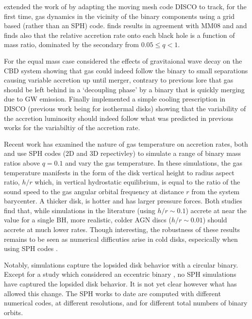 \citep{Farris:2014} extended the work of \citep{DHM:2013:MNRAS} by adapting the
moving mesh code DISCO \citep{Duffell:2011:TESS,
DuffellMHDDISCO:2016} to track, for the first time, gas dynamics in the
vicinity of the binary components using a grid based (rather than an SPH)
code. \citep{Farris:2014} finds results in agreement with MM08 and
\citep{DHM:2013:MNRAS} and finds also that the relative accretion rate onto
each black hole is a function of mass ratio, dominated by the secondary from
$0.05 \leq q < 1$. 


For the equal mass case \citep{Farris:2015:GW} considered
the effects of gravitaional wave decay on the CBD system showing that gas
could indeed follow the binary to small separations causing variable accretion
up until merger, contrary to previous lore that gas should be left behind in a
`decoupling phase' by a binary that is quickly merging due to GW emission.
Finally \citep{Farris:2015:Cool} implemented a simple cooling prescription in
DISCO (previous work being for isothermal disks) showing that the variability
of the accretion luminosity should indeed follow what was predicted in
previous works for the variabiltiy of the accretion rate.



Recent work has examined the nature of gas temperature on accretion rates,
both \cite{YoungClarke:2015} and \cite{RagusaLodato:2016} use SPH codes (2D
and 3D repectivley) to simulate a range of binary mass ratios above $q=0.1$
and vary the gas temperature. In these simulations, the gas temperature
manifests in the form of the disk vertical height to radius aspect ratio,
$h/r$ which, in vertical hydrostatic equilibrium, is equal to the ratio of the
sound speed to the gas angular orbital frequency at distance $r$ from the
system barycenter. A thicker disk, is hotter and has larger pressure forces.
Both studies find that, while simulations in the literature (using $h/r \sim
0.1$) accrete at near the value for a single BH, more realistic, colder AGN
discs ($h/r \sim 0.01$) should accrete at much lower rates. Though
interesting, the robustness of these results remains to be seen as numerical
difficuties arise in cold disks, especically when using SPH codes \citep{}.


Notably, \citep{RagusaLodato:2016} simulations capture the lopsided disk
behavior with a circular binary. Except for a study which considered an
eccentric binary \citep{Dunhill+2015}, no SPH simulations have captured the
lopsided disk behavior. It is not yet clear however what has allowed this
change. The SPH works to date are computed with different numerical codes, at
different resolutions, and for different total numbers of binary orbits.


